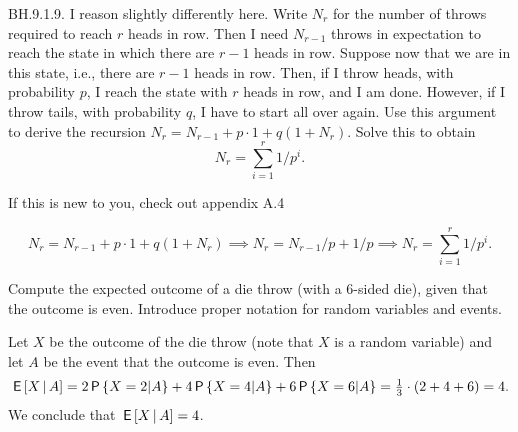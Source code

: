 \begin{exercise}
BH.9.1.9. I reason slightly differently here. Write $N_{r}$ for the number of throws required to reach $r$ heads in row. Then I need $N_{r-1}$ throws in expectation to reach the state in which there are $r-1$ heads in row. Suppose now that we are in this state, i.e.,  there are $r-1$ heads in row. Then, if I throw heads, with probability $p$, I reach the state with $r$ heads in row, and I am done. However, if I throw tails, with probability $q$, I have to start all over again.  Use this argument to derive the recursion $N_{r} = N_{r-1} + p\cdot 1 + q(1+N_{r})$.  Solve this to obtain
\begin{equation}
N_{r} = \sum_{i=1}^{r} 1/p^i.
\end{equation}
\begin{hint}
  If this is new to you, check out appendix A.4
\end{hint}
\begin{solution}
\begin{equation}
N_{r} = N_{r-1} + p\cdot 1 + q(1+N_{r}) \implies N_{r} = N_{r-1}/p + 1/p \implies N_{r} = \sum_{i=1}^{r} 1/p^i.
\end{equation}
\end{solution}
\end{exercise}

\begin{exercise}
Compute the expected outcome of a die throw (with a 6-sided die), given that the outcome is even. Introduce proper notation for random variables and events.
\begin{solution}
Let $X$ be the outcome of the die throw (note that $X$ is a random variable) and let $A$ be the event that the outcome is even. Then
\begin{equation*}
\,\mathsf{E}\left[X\,\middle|\, A\right] = 2 \,\mathsf{P}\left\{X=2|A\right\} + 4 \,\mathsf{P}\left\{X=4|A\right\} + 6 \,\mathsf{P}\left\{X=6|A\right\} = \tfrac13 \cdot (2+4+6)  = 4.
\end{equation*}
We conclude that $\,\mathsf{E}\left[X\,\middle|\, A\right] = 4$.
\end{solution}
\end{exercise}

